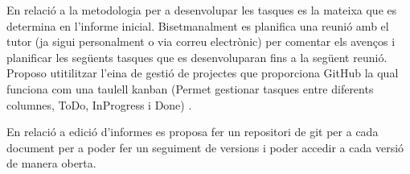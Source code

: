 \documentclass[conference,onecolumn, catalan]{IEEEtran}
\begin{document}
En relació a la metodologia per a desenvolupar les tasques es la mateixa que es determina en l'informe inicial. Bisetmanalment es planifica una reunió amb el tutor (ja sigui personalment o via correu electrònic) per comentar els avenços i planificar les següents tasques que es desenvoluparan fins a la següent reunió. Proposo utitilitzar l'eina de gestió de projectes que proporciona GitHub la qual funciona com una taulell kanban (Permet gestionar tasques entre diferents columnes, ToDo, InProgress i Done) \cite{noauthor_4a1c0/rv32i-verilog_nodate}. 

En relació a edició d'informes es proposa fer un repositori de git per a cada document per a poder fer un seguiment de versions i poder accedir a cada versió de manera oberta.








\end{document}
